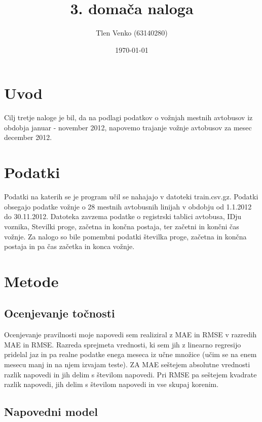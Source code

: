 \documentclass[a4paper,11pt]{article}
\title{3. domača naloga}
\author{Tlen Venko (63140280)}
\date{\today}
\begin{document}
\maketitle

\section{Uvod}

Cilj tretje naloge je bil, da na podlagi podatkov o vožnjah mestnih avtobusov iz obdobja januar - november 2012, napovemo trajanje vožnje avtobusov za mesec december 2012.

\section{Podatki}

Podatki na katerih se je program učil se nahajajo v datoteki train.csv.gz. Podatki obsegajo podatke vožnje o 28 mestnih avtobusnih linijah v obdobju od 1.1.2012 do 30.11.2012. Datoteka zavzema podatke o registrski tablici avtobusa, IDju voznika, Stevilki proge, začetna in končna postaja, ter začetni in končni čas vožnje. Za nalogo so bile pomembni podatki številka proge, začetna in končna postaja in pa čas začetka in konca vožnje.

\section{Metode}

\subsection{Ocenjevanje točnosti}

Ocenjevanje pravilnosti moje napovedi sem realiziral z MAE in RMSE v razredih MAE in RMSE. Razreda sprejmeta vrednosti, ki sem jih z linearno regresijo pridelal jaz in pa realne podatke enega meseca iz učne množice (učim se na enem mesecu manj in na njem izvajam teste). ZA MAE seštejem absolutne vrednosti razlik napovedi in jih delim s številom napovedi. Pri RMSE pa seštejem kvadrate razlik napovedi, jih delim s številom napovedi in vse skupaj korenim. 

\subsection{Napovedni model}
\end{document}
